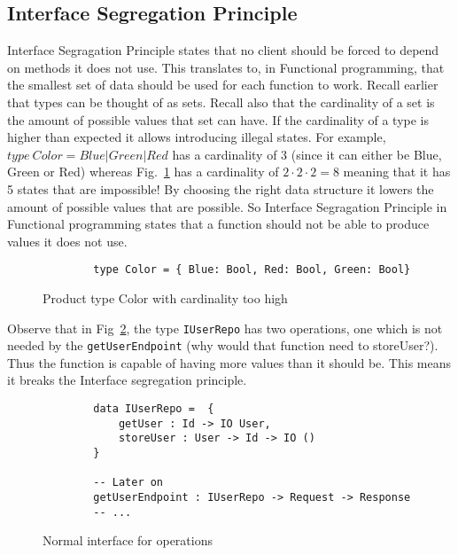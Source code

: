 \subsection{Interface Segregation Principle} 

Interface Segragation Principle states that no client should be forced to depend
on methods it does not use. This translates to, in Functional
programming, that the smallest set of data should be used for each function to
work. Recall earlier that types can be thought of as sets. Recall also that the
cardinality of a set is the amount of possible values that set can have. If the
cardinality of a type is higher than expected it allows introducing illegal
states. For example, $type\ Color = Blue | Green | Red$ has a cardinality of 3
(since it can either be Blue, Green or Red) whereas Fig.~\ref{colorcardinality}
has a cardinality of $2\cdot 2\cdot 2 = 8$ meaning that it has 5 states that are
impossible! By choosing the right data structure it lowers the amount of
possible values that are possible. So Interface Segragation Principle in
Functional programming states that a function should not be able to produce
values it does not use.

\begin{figure}[H]
    \begin{lstlisting}
        type Color = { Blue: Bool, Red: Bool, Green: Bool}
    \end{lstlisting}
    \caption{Product type Color with cardinality too high}
    \label{colorcardinality}
\end{figure}

Observe that in Fig~\ref{twomanyoperations}, the type \texttt{IUserRepo} has two
operations, one which is not needed by the \texttt{getUserEndpoint} (why would 
that function need to storeUser?). Thus the function is capable of having more 
values than it should be. This means it breaks the Interface segregation principle.

\begin{figure}[H]
    \begin{lstlisting}
        data IUserRepo =  {
            getUser : Id -> IO User,
            storeUser : User -> Id -> IO ()
        }

        -- Later on
        getUserEndpoint : IUserRepo -> Request -> Response
		-- ...
    \end{lstlisting}
    \caption{Normal interface for operations}
    \label{twomanyoperations}
\end{figure}

